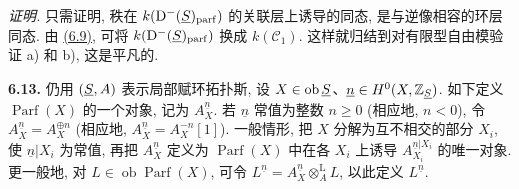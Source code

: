 \providecommand{\Cpx}{\mathrm C}
\providecommand{\Kpx}{\mathrm K}
\providecommand{\Dpx}{\mathrm D}
\providecommand{\Ho}{\mathrm H}
\providecommand{\RHom}{\mathrm R\!\operatorname{Hom}}
\providecommand{\Ob}{\operatorname{ob}}
\providecommand{\Hom}{\operatorname{Hom}}
\providecommand{\RHom}{\mathrm R\!\operatorname{Hom}}
\providecommand{\Ext}{\operatorname{Ext}}
\providecommand{\Tor}{\operatorname{Tor}}
\providecommand{\Tr}{\operatorname{Tr}}
\providecommand{\Add}{\operatorname{Add}}
\providecommand{\Cart}{\operatorname{Cart}}
\providecommand{\Parf}{\operatorname{Parf}}
\providecommand{\coh}{\operatorname{coh}}
\providecommand{\amp}{\operatorname{amp}}
\providecommand{\cl}{\operatorname{cl}}
\providecommand{\rg}{\operatorname{rg}}
\providecommand{\Id}{\operatorname{Id}}
\providecommand{\Ker}{\operatorname{Ker}}
\providecommand{\Im}{\operatorname{Im}}
\providecommand{\cH}{\mathcal H}
\providecommand{\Zs}{\mathbb Z_{\sgaIS}}
\providecommand{\A}{\mathcal A}
\providecommand{\cC}{\mathcal C}
\providecommand{\cCzero}{\mathcal C_0}
\providecommand{\otL}{\mathop{\otimes}^{\mathrm L}}
\providecommand{\tamp}{\operatorname{tor.amp}}
\providecommand{\pamp}{\operatorname{parf.amp}}
\providecommand{\pdim}{\operatorname{parf.dim}}
\providecommand{\bon}{\mathrm b}
\providecommand{\parf}{\operatorname{parf}}
\providecommand{\parff}{\operatorname{parf}}
\providecommand{\ac}{\mathrm{ac}}


\providecommand{\End}{\operatorname{End}}
\providecommand{\tr}{\operatorname{tr}}

\emph{证明.} 只需证明, 秩在 \(k(\Dpx^-(\sgaIS)_{\mathrm{parf}})\) 的关联层上诱导的同态, 是与逆像相容的环层同态. 由 \hyperlink{sga6.e01.para.6-9}{(6.9)}, 可将 \(k(\Dpx^-(\sgaIS)_{\mathrm{parf}})\) 换成 \(k(\mathcal C_1)\). 这样就归结到对有限型自由模验证 a) 和 b), 这是平凡的.

\textbf{6.13.} 仍用 \((\underline S,A)\) 表示局部赋环拓扑斯, 设 \(X\in\Ob\sgaIS\)、\(\underline n\in H^0(X,\mathbb Z_{\underline S})\). 如下定义 \(\Parf(X)\) 的一个对象, 记为 \(A_X^{\underline n}\). 若 \(\underline n\) 常值为整数 \(n\geq0\) (相应地, \(n<0\)), 令 \(A_X^{\underline n}=A_X^{\oplus n}\) (相应地, \(A_X^{\underline n}=A_X^{-n}[1]\)). 一般情形, 把 \(X\) 分解为互不相交的部分 \(X_i\), 使 \(\underline n|X_i\) 为常值, 再把 \(A_X^{\underline n}\) 定义为 \(\Parf(X)\) 中在各 \(X_i\) 上诱导 \(A_{X_i}^{\underline n|X_i}\) 的唯一对象. 更一般地, 对 \(L\in\Ob\Parf(X)\), 可令 \(L^{\underline n}=A_X^{\underline n}\otL_A L\), 以此定义 \(L^{\underline n}\).

